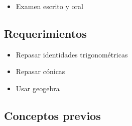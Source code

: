 \begin{itemize}
    \item Examen escrito y oral
\end{itemize}

\subsection{Requerimientos}

\begin{itemize}
    \item Repasar identidades trigonométricas
    \item Repasar cónicas
    \item Usar geogebra
\end{itemize}

\subsection{Conceptos previos}


